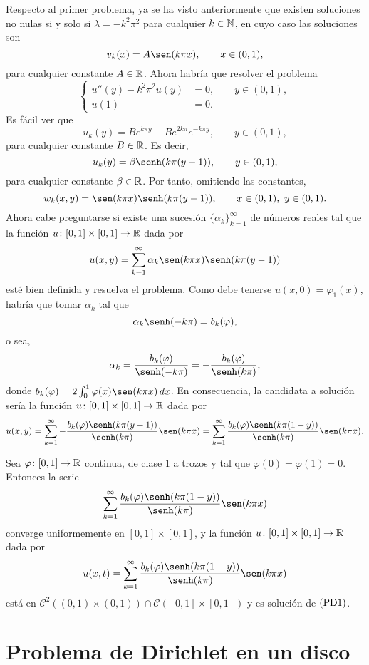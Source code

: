 \documentclass[a4paper, 12pt, extrafontsizes]{memoir}
\begin{document}
Respecto al primer problema, ya se ha visto anteriormente que existen soluciones no nulas si y solo si $\lambda = -k^2\pi^2$ para cualquier $k \in \mathbb N$, en cuyo caso las soluciones son
\[v_k(x) = A\sen(k\pi x), \qquad x\in(0,1),\]
para cualquier constante $A \in \mathbb R$. Ahora habría que resolver el problema
\[\left\{\begin{alignedat}{1}
    u''(y)-k^2\pi^2 u(y) &= 0, \qquad y \in (0,1), \\
    u(1) &= 0.
\end{alignedat}\right.\]
Es fácil ver que
\[u_k(y)= Be^{k\pi y}-Be^{2k\pi}e^{-k\pi y}, \qquad y \in (0,1),\]
para cualquier constante $B \in \mathbb R$. Es decir,
\[u_k(y)= \beta \senh(k\pi(y-1)), \qquad y \in (0,1),\]
para cualquier constante $\beta \in \mathbb R$. Por tanto, omitiendo las constantes,
\[w_k(x,y)=\sen(k\pi x)\senh(k\pi(y-1)), \qquad x \in (0,1), \ y \in (0,1).\]
Ahora cabe preguntarse si existe una sucesión $\{\alpha_k\}_{k=1}^\infty$ de números reales tal que la función $u \colon [0,1] \times [0,1] \to \mathbb R$ dada por
\[u(x,y) = \sum_{k=1}^\infty \alpha_k\sen(k\pi x)\senh(k\pi(y-1))\]
esté bien definida y resuelva el problema. Como debe tenerse $u(x,0) = \varphi_1(x)$, habría que tomar $\alpha_k$ tal que
\[\alpha_k\senh(-k\pi) = b_k(\varphi),\]
o sea,
\[\alpha_k= \frac{b_k(\varphi)}{\senh(-k\pi)} = -\frac{b_k(\varphi)}{\senh(k\pi)},\]
donde $b_k(\varphi) = 2\int_0^1 \varphi(x) \sen(k\pi x) \, dx$. En consecuencia, la candidata a solución sería la función $u \colon [0,1] \times [0,1] \to \mathbb R$ dada por
\[u(x,y) = \sum_{k=1}^\infty -\frac{b_k(\varphi)\senh(k\pi(y-1))}{\senh(k\pi)}\sen(k\pi x) = \sum_{k=1}^\infty \frac{b_k(\varphi)\senh(k\pi(1-y))}{\senh(k\pi)}\sen(k\pi x). \]

\begin{theorem}
    Sea $\varphi \colon [0,1] \to \mathbb R$ continua, de clase $1$ a trozos y tal que $\varphi(0)=\varphi(1)=0$. Entonces la serie 
    \[ \sum_{k=1}^\infty \frac{b_k(\varphi)\senh(k\pi(1-y))}{\senh(k\pi)}\sen(k\pi x)\]
    converge uniformemente en $[0,1] \times [0,1]$, y la función $u \colon [0,1] \times [0,1] \to \mathbb R$ dada por
    \[u(x,t) =  \sum_{k=1}^\infty \frac{b_k(\varphi)\senh(k\pi(1-y))}{\senh(k\pi)}\sen(k\pi x)\]
    está en $\mathcal{C}^2((0,1) \times (0,1)) \cap \mathcal{C}([0,1] \times [0,1])$ y es solución de $\textup{(PD1)}$. 
\end{theorem}

\section{Problema de Dirichlet en un disco}
\end{document}
